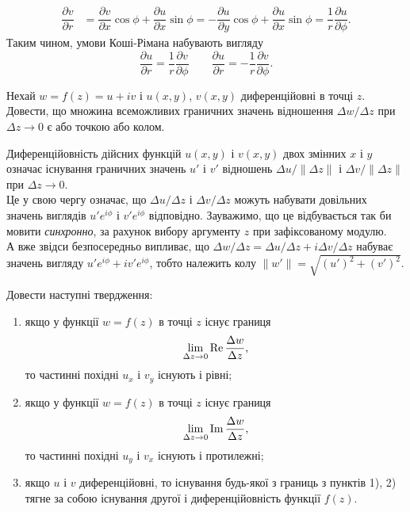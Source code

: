 \begin{solution}
\begin{align*}
        \\
        \dfrac {\partial v}{\partial r} &= \dfrac {\partial v}{\partial x} \cos \phi + \dfrac {\partial u}{\partial x} \sin \phi = - \dfrac {\partial u}{\partial y} \cos \phi + \dfrac {\partial u}{\partial x} \sin \phi = \dfrac 1r \dfrac {\partial u}{\partial \phi}.
    \end{align*}
    Таким чином, умови Коші-Рімана набувають вигляду 
    \[ \dfrac{\partial u}{\partial r} = \dfrac 1r \dfrac{\partial v}{\partial \phi} \qquad \dfrac{\partial u}{\partial r} = - \dfrac 1r \dfrac{\partial v}{\partial \phi}. \]
\end{solution}

\begin{problem}[Волковиський, 143]
    Нехай $w = f(z) = u + i v$ і $u(x, y)$, $v(x, y)$ диференційовні в точці $z$. Довести, що множина всеможливих граничних значень відношення $\Delta w / \Delta z$ при $\Delta z \to 0$ є або точкою або колом.
\end{problem}

\begin{solution}
    Диференційовність дійсних функцій $u(x, y)$ і $v(x, y)$ двох змінних $x$ і $y$ означає існування граничних значень $u'$ і $v'$ відношень $\Delta u / \|\Delta z\|$ і $\Delta v / \|\Delta z\|$ при $\Delta z \to 0$. \\
    
    Це у свою чергу означає, що $\Delta u / \Delta z$ і $\Delta v / \Delta z$ можуть набувати довільних значень виглядів $u' e^{i \phi}$ і $v' e^{i \phi}$ відповідно. Зауважимо, що це відбувається так би мовити \textit{синхронно}, за рахунок вибору аргументу $z$ при зафіксованому модулю. \\
    
    А вже звідси безпосередньо випливає, що $\Delta w / \Delta z = \Delta u / \Delta z + i \Delta v / \Delta z$ набуває значень вигляду $u' e^{i \phi} + i v' e^{i \phi}$, тобто належить колу $\|w'\| = \sqrt{(u')^2 + (v')^2}$.
\end{solution}

\begin{problem}[Волковиський, 140]
    Довести наступні твердження:
    \begin{enumerate}
        \item якщо у функції $w = f(z)$ в точці $z$ існує границя 
        \[ \displaystyle\lim\limits_{\Delta z \to 0} \operatorname{Re} \dfrac{\Delta w}{\Delta z}, \]
        то частинні похідні $u_x$ і $v_y$ існують і рівні;
        \item якщо у функції $w = f(z)$ в точці $z$ існує границя 
        \[ \displaystyle\lim\limits_{\Delta z \to 0} \operatorname{Im} \dfrac{\Delta w}{\Delta z}, \]
        то частинні похідні $u_y$ і $v_x$ існують і протилежні;
        \item якщо $u$ і $v$ диференційовні, то існування будь-якої з границь з пунктів 1), 2) тягне за собою існування другої і диференційовність функції $f(z)$.
    \end{enumerate}
\end{problem}

